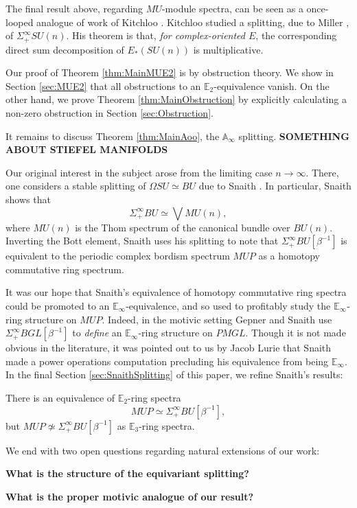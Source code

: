 The final result above, regarding $MU$-module spectra, can be seen as a once-looped analogue of work of Kitchloo \cite{Kitchloo}.   Kitchloo studied a splitting, due to Miller \cite{MillerSplitting}, of $\Sigma^{\infty}_+ SU(n)$.  His theorem is that, \textit{for complex-oriented $E$}, the corresponding direct sum decomposition of $E_*(SU(n))$ is multiplicative.

Our proof of Theorem \ref{thm:MainMUE2} is by obstruction theory.  We show in Section \ref{sec:MUE2} that all obstructions to an $\mathbb{E}_2$-equivalence vanish.  On the other hand, we prove Theorem \ref{thm:MainObstruction} by explicitly calculating a non-zero obstruction in Section \ref{sec:Obstruction}.

It remains to discuss Theorem \ref{thm:MainAoo}, the $\mathbb{A}_\infty$ splitting.
\textbf{SOMETHING ABOUT STIEFEL MANIFOLDS}

Our original interest in the subject arose from the limiting case $n \rightarrow \infty$.  There, one considers a stable splitting of $\Omega SU \simeq BU$ due to Snaith \cite{SnaithBook}.  In particular, Snaith shows that
$$\Sigma^{\infty}_+ BU \simeq \bigvee MU(n),$$
where $MU(n)$ is the Thom spectrum of the canonical bundle over $BU(n)$.  Inverting the Bott element, Snaith uses his splitting to note that $\Sigma^{\infty}_+ BU [\beta^{-1}]$ is equivalent to the periodic complex bordism spectrum $MUP$ as a homotopy commutative ring spectrum.

It was our hope that Snaith's equivalence of homotopy commutative ring spectra could be promoted to an $\mathbb{E}_\infty$-equivalence, and so used to profitably study the $\mathbb{E}_\infty$-ring structure on $MUP$.  Indeed, in the motivic setting Gepner and Snaith \cite{GepnerSnaith} use $\Sigma^{\infty}_+ BGL[\beta^{-1}]$ to \textit{define} an $\mathbb{E}_\infty$-ring structure on $PMGL$.  Though it is not made obvious in the literature, it was pointed out to us by Jacob Lurie that Snaith \cite{SnaithNotMultiplicative} made a power operations computation precluding his equivalence from being $\mathbb{E}_\infty$.  In the final Section \ref{sec:SnaithSplitting} of this paper, we refine Snaith's results:

\begin{thm}
There is an equivalence of $\mathbb{E}_2$-ring spectra
$$MUP \simeq \Sigma^{\infty}_+ BU[\beta^{-1}],$$
but $MUP \not \simeq \Sigma^{\infty}_+ BU[\beta^{-1}]$ as $\mathbb{E}_3$-ring spectra.
\end{thm}

We end with two open questions regarding natural extensions of our work:

\textbf{What is the structure of the equivariant splitting?}

\textbf{What is the proper motivic analogue of our result?}





